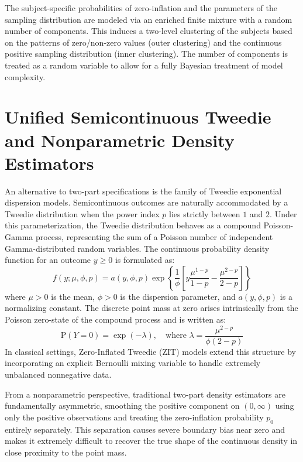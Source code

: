 \documentclass[11pt, a4paper]{article}
\begin{document}
The subject-specific probabilities of zero-inflation and the parameters of the sampling distribution are modeled via an enriched finite mixture with a random number of components.\cite{dellaportas2006, papageorgiou2011} This induces a two-level clustering of the subjects based on the patterns of zero/non-zero values (outer clustering) and the continuous positive sampling distribution (inner clustering).\cite{dellaportas2006, richardson1997, papageorgiou2011} The number of components is treated as a random variable to allow for a fully Bayesian treatment of model complexity.\cite{papageorgiou2011, miller2018}


\section{Unified Semicontinuous Tweedie and Nonparametric Density Estimators}

An alternative to two-part specifications is the family of Tweedie exponential dispersion models.\cite{albert2005, kokonendji2021, tweedie1984} Semicontinuous outcomes are naturally accommodated by a Tweedie distribution when the power index $p$ lies strictly between $1$ and $2$.\cite{albert2005, kokonendji2021, tweedie1984} Under this parameterization, the Tweedie distribution behaves as a compound Poisson-Gamma process, representing the sum of a Poisson number of independent Gamma-distributed random variables.\cite{tweedie1984} The continuous probability density function for an outcome $y \ge 0$ is formulated as:
\begin{equation}
f(y; \mu, \phi, p) = a(y, \phi, p) \exp \left\{ \frac{1}{\phi} \left[ y \frac{\mu^{1-p}}{1-p} - \frac{\mu^{2-p}}{2-p} \right] \right\}
\end{equation}
where $\mu > 0$ is the mean, $\phi > 0$ is the dispersion parameter, and $a(y, \phi, p)$ is a normalizing constant.\cite{tweedie1984} The discrete point mass at zero arises intrinsically from the Poisson zero-state of the compound process and is written as:
\begin{equation}
\text{P}(Y = 0) = \exp(-\lambda), \quad \text{where } \lambda = \frac{\mu^{2-p}}{\phi (2-p)}
\end{equation}
In classical settings, Zero-Inflated Tweedie (ZIT) models extend this structure by incorporating an explicit Bernoulli mixing variable to handle extremely unbalanced nonnegative data.\cite{tweedie1984} 

From a nonparametric perspective, traditional two-part density estimators are fundamentally asymmetric, smoothing the positive component on $(0, \infty)$ using only the positive observations and treating the zero-inflation probability $p_0$ entirely separately.\cite{albert2005, kokonendji2021} This separation causes severe boundary bias near zero and makes it extremely difficult to recover the true shape of the continuous density in close proximity to the point mass.\cite{albert2005, kokonendji2021} 
\end{document}
